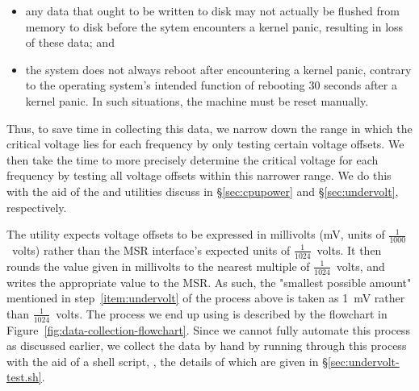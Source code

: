 \begin{itemize}
    \item any data that ought to be written to disk may not actually be flushed
        from memory to disk before the sytem encounters a kernel panic, 
        resulting in loss of these data; and
    \item the system does not always reboot after encountering a kernel panic,
        contrary to the operating system's intended function of rebooting 30
        seconds after a kernel panic. In such situations, the machine must be
        reset manually.
\end{itemize}

Thus, to save time in collecting this data, we narrow down the range in which
the critical voltage lies for each frequency by only testing certain voltage
offsets. We then take the time to more precisely determine the critical voltage
for each frequency by testing all voltage offsets within this narrower range.
We do this with the aid of the  and  utilities
discuss in §\ref{sec:cpupower} and §\ref{sec:undervolt}, respectively.

The  utility expects voltage offsets to be expressed in
millivolts (mV, units of $\frac{1}{1000}$~volts) rather than the MSR interface's
expected units of $\frac{1}{1024}$~volts. It then rounds the value given in
millivolts to the nearest multiple of $\frac{1}{1024}$~volts, and writes the
appropriate value to the MSR. As such, the "smallest possible amount" mentioned
in step~\ref{item:undervolt} of the process above is taken as 1~mV rather than
$\frac{1}{1024}$~volts. The process we end up using is described by the
flowchart in Figure~\ref{fig:data-collection-flowchart}. Since we cannot fully
automate this process as discussed earlier, we collect the data by hand by
running through this process with the aid of a shell script,
, the details of which are given in
§\ref{sec:undervolt-test.sh}.

